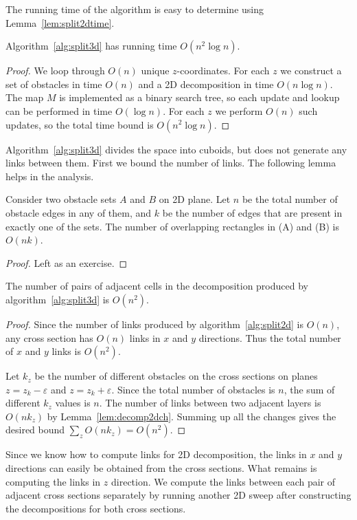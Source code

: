 \documentclass[english,gradu]{tktltiki2018}
\begin{document}
The running time of the algorithm is easy to determine using Lemma~\ref{lem:split2dtime}.

\begin{lem}\label{lem:split3dtime}Algorithm~\ref{alg:split3d} has running time $O(n^2\log n)$.\end{lem}
\begin{proof}
We loop through $O(n)$ unique $z$-coordinates.
For each $z$ we construct a set of obstacles in time $O(n)$ and a 2D decomposition in time $O(n\log n)$.
The map $M$ is implemented as a binary search tree, so each update and lookup can be performed in time $O(\log n)$.
For each $z$ we perform $O(n)$ such updates, so the total time bound is $O(n^2\log n)$.
\end{proof}

Algorithm~\ref{alg:split3d} divides the space into cuboids, but does not generate any links between them.
First we bound the number of links.
The following lemma helps in the analysis.

\begin{lem}\label{lem:decomp2dch}
Consider two obstacle sets $A$ and $B$ on 2D plane.
Let $n$ be the total number of obstacle edges in any of them, and $k$ be the number of edges that are present in exactly one of the sets.
The number of overlapping rectangles in (A) and (B) is $O(nk)$.
\end{lem}
\begin{proof}Left as an exercise.\end{proof}

\begin{lem}The number of pairs of adjacent cells in the decomposition produced by algorithm~\ref{alg:split3d} is $O(n^2)$.\end{lem}
\begin{proof}
Since the number of links produced by algorithm~\ref{alg:split2d} is $O(n)$, any cross section has $O(n)$ links in $x$ and $y$ directions.
Thus the total number of $x$ and $y$ links is $O(n^2)$.

Let $k_z$ be the number of different obstacles on the cross sections on planes $z=z_k-\varepsilon$ and $z=z_k+\varepsilon$.
Since the total number of obstacles is $n$, the sum of different $k_z$ values is $n$.
The number of links between two adjacent layers is $O(nk_z)$ by Lemma~\ref{lem:decomp2dch}.
Summing up all the changes gives the desired bound $\sum_z O(nk_z) = O(n^2)$.
\end{proof}

Since we know how to compute links for 2D decomposition, the links in $x$ and $y$ directions can easily be obtained from the cross sections.
What remains is computing the links in $z$ direction.
We compute the links between each pair of adjacent cross sections separately by running another 2D sweep after constructing the decompositions for both cross sections.
\end{document}
